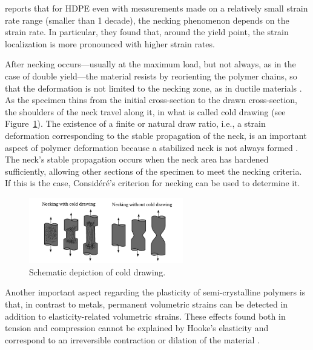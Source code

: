 \cite{yeKinematicStudyNecking2015} reports that for HDPE even with measurements made on a relatively small strain rate range (smaller than 1 decade), the necking phenomenon depends on the strain rate.
In particular, they found that, around the yield point, the strain localization is more pronounced with higher strain rates.

After necking occurs—usually at the maximum load, but not always, as in the case of double yield—the material resists by reorienting the polymer chains, so that the deformation is not limited to the necking zone, as in ductile materials \citep{callister2014materials}.
As the specimen thins from the initial cross-section to the drawn cross-section, the shoulders of the neck travel along it, in what is called cold drawing (see Figure~\ref{fig:natural_draw_ratio}).
The existence of a finite or natural draw ratio, i.e., a strain deformation corresponding to the stable propagation of the neck, is an important aspect of polymer deformation because a stabilized neck is not always formed \citep{wardIntroductionMechanicalProperties2004}.
The neck's stable propagation occurs when the neck area has hardened sufficiently, allowing other sections of the specimen to meet the necking criteria.
If this is the case, Considéré's criterion for necking can be used to determine it.
\begin{figure}[hbtp]
	\centering
	\includegraphics[width=0.6\textwidth]{figures/natural_draw_ratio}
	\caption{Schematic depiction of cold drawing.}
\label{fig:natural_draw_ratio}
\end{figure}

Another important aspect regarding the plasticity of semi-crystalline polymers is that, in contrast to metals, permanent volumetric strains can be detected in addition to elasticity-related volumetric strains.
These effects found both in tension and compression cannot be explained by Hooke's elasticity and correspond to an irreversible contraction or dilation of the material \citep{cangemiTwoPhaseModelMechanical2001,polanco-loriaConstitutiveModelThermoplastics2010}.

